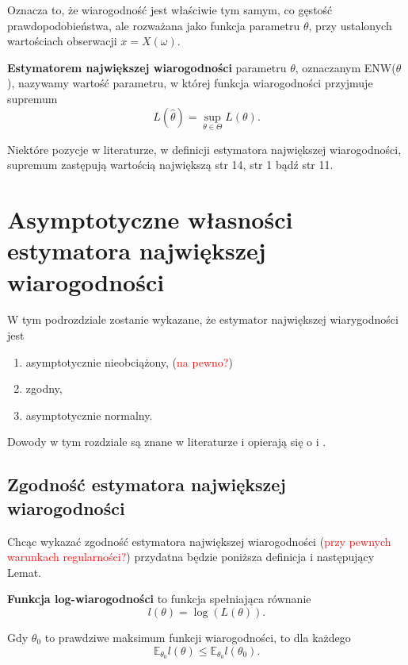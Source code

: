 Oznacza to, że wiarogodność jest właściwie tym samym, co gęstość prawdopodobieństwa,
ale rozważana jako funkcja parametru $\theta$, przy ustalonych wartościach obserwacji
$x = X(\omega)$.


\begin{definition}
\textbf{Estymatorem największej wiarogodności} parametru $\theta$, oznaczanym ENW($\theta$), nazywamy wartość parametru, w której funkcja
wiarogodności przyjmuje supremum $$L(\hat{\theta}) = \sup_{\theta \in \Theta} L(\theta).$$

\end{definition}

Niektóre pozycje w literaturze, w definicji estymatora największej wiarogodności, supremum zastępują wartością największą \cite{rydl1} str 14, \cite{sfu1} str 1 bądź \cite{mit0} str 11.

\section{Asymptotyczne własności estymatora największej wiarogodności}

W tym podrozdziale zostanie wykazane, że estymator największej wiarygodności jest
\begin{enumerate}
\item asymptotycznie nieobciążony, (\textcolor{red}{na pewno?})
\item zgodny,
\item asymptotycznie normalny.
\end{enumerate}

Dowody w tym rozdziale są znane w literaturze i opierają się o \cite{mit1} i \cite{sfu1}.



\subsection{Zgodność estymatora największej wiarogodności}

Chcąc wykazać zgodność estymatora największej wiarogodności (\textcolor{red}{przy pewnych warunkach regularności?})
przydatna będzie poniższa definicja i następujący Lemat.
\begin{definition}
\textbf{Funkcja log-wiarogodności} to funkcja spełniająca równanie
$$l(\theta) = \log(L(\theta)).$$
\end{definition}

\begin{lemma}\label{l:pierwszy}
Gdy $\theta_0$ to prawdziwe maksimum funkcji wiarogodności, to dla każdego \text{$\theta \in \Theta$}
$$\mathbb{E}_{\theta_0}l(\theta) \leq \mathbb{E}_{\theta_0}l(\theta_0).$$
\end{lemma}

